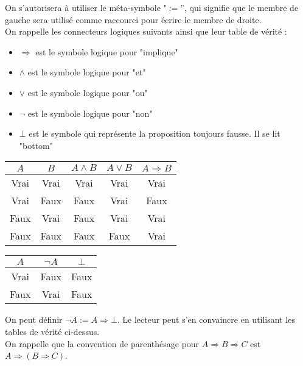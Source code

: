 \documentclass[a4paper,12pt]{article}
\theoremstyle{plain}
\begin{document}
On s'autorisera à utiliser le méta-symbole "$:=$'', qui signifie que le membre de gauche sera utilisé comme raccourci pour écrire le membre de droite.\\

On rappelle les connecteurs logiques suivants ainsi que leur table de vérité :

\begin{itemize}
\item $\Rightarrow$ est le symbole logique pour "implique"
\item $\land$ est le symbole logique pour "et"
\item $\lor$ est le symbole logique pour "ou"
\item $\neg$ est le symbole logique pour "non"
\item $\bot$ est le symbole qui représente la proposition toujours fausse. Il se lit "bottom"
\end{itemize}

\begin{center}
\begin{tabular}{|c c | c | c | c |}
\hline
$A$ & $B$ & $A \land B$ & $A \lor B$ & $A \Rightarrow B$\\
\hline
Vrai & Vrai & Vrai & Vrai & Vrai\\
\hline
Vrai & Faux & Faux & Vrai & Faux\\
\hline
Faux & Vrai & Faux & Vrai & Vrai\\
\hline
Faux & Faux & Faux & Faux & Vrai\\
\hline
\end{tabular}
\label{tab verite}
\end{center}

\begin{center}
\begin{tabular}{|c | c | c |}
\hline
$A$ & $\neg A$ & $\bot$\\
\hline
Vrai & Faux & Faux \\
\hline
Faux& Vrai & Faux \\
\hline
\end{tabular}
\end{center}

On peut définir $\neg A := A \Rightarrow\bot$. Le lecteur peut s'en convaincre en utilisant les tables de vérité ci-dessus.\\

On rappelle que la convention de parenthésage pour $A \Rightarrow B \Rightarrow C$ est $A \Rightarrow( B \Rightarrow C)$.

\clearpage
\end{document}

